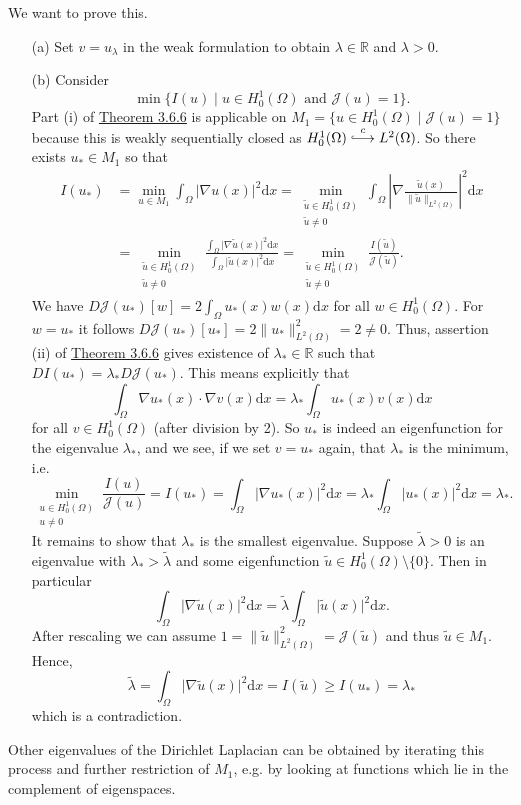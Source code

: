 \begin{example}
We want to prove this.
\begin{itemize}
	\item[(a)] Set $v=u_\lambda$ in the weak formulation to obtain $\lambda\in\mathbb{R}$ and $\lambda>0$.
	\item[(b)] Consider
	\[\min\{I(u)\mid u\in H_0^1(\Omega)\text{ and }\mathcal{J}(u)=1\}.\]
	Part (i) of \hyperlink{theorem_3_6_6}{Theorem 3.6.6} is applicable on $M_1=\{u\in H_0^1(\Omega)\mid\mathcal{J}(u)=1\}$ because this is weakly sequentially closed as $H_0^1(\Omega)\clonghookrightarrow L^2(\Omega)$. So there exists $u_*\in M_1$ so that
	\begin{align*}
		I(u_*)&=\min_{u\in M_1}{\int_\Omega{\lvert\nabla u(x)\rvert^2\mathrm{d}x}}=\min_{\substack{\tilde{u}\in H_0^1(\Omega)\\\tilde{u}\ne0}}{\int_\Omega{\left\lvert\nabla\frac{\tilde{u}(x)}{\lVert\tilde{u}\rVert_{L^2(\Omega)}}\right\rvert^2\mathrm{d}x}}\\
		&=\min_{\substack{\tilde{u}\in H_0^1(\Omega)\\\tilde{u}\ne0}}{\frac{\int_\Omega{\lvert\nabla\tilde{u}(x)\rvert^2\mathrm{d}x}}{\int_\Omega{\lvert\tilde{u}(x)\rvert^2\mathrm{d}x}}}=\min_{\substack{\tilde{u}\in H_0^1(\Omega)\\\tilde{u}\ne0}}{\frac{I(\tilde{u})}{\mathcal{J}(\tilde{u})}}.
	\end{align*}
	We have $D\mathcal{J}(u_*)[w]=2\int_\Omega{u_*(x)w(x)\mathrm{d}x}$ for all $w\in H_0^1(\Omega)$. For $w=u_*$ it follows $D\mathcal{J}(u_*)[u_*]=2\lVert u_*\rVert_{L^2(\Omega)}^2=2\ne0$. Thus, assertion (ii) of \hyperlink{theorem_3_6_6}{Theorem 3.6.6} gives existence of $\lambda_*\in\mathbb{R}$ such that $DI(u_*)=\lambda_*D\mathcal{J}(u_*)$. This means explicitly that
	\[\int_\Omega{\nabla u_*(x)\cdot\nabla v(x)\mathrm{d}x}=\lambda_*\int_\Omega{u_*(x)v(x)\mathrm{d}x}\]
	for all $v\in H_0^1(\Omega)$ (after division by 2). So $u_*$ is indeed an eigenfunction for the eigenvalue $\lambda_*$, and we see, if we set $v=u_*$ again, that $\lambda_*$ is the minimum, i.e.
	\[\min_{\substack{u\in H_0^1(\Omega)\\u\ne0}}{\frac{I(u)}{\mathcal{J}(u)}}=I(u_*)=\int_\Omega{\lvert\nabla u_*(x)\rvert^2\mathrm{d}x}=\lambda_*\int_\Omega{\lvert u_*(x)\rvert^2\mathrm{d}x}=\lambda_*.\]
	It remains to show that $\lambda_*$ is the smallest eigenvalue. Suppose $\tilde{\lambda}>0$ is an eigenvalue with $\lambda_*>\tilde{\lambda}$ and some eigenfunction $\tilde{u}\in H_0^1(\Omega)\setminus\{0\}$. Then in particular
	\[\int_\Omega{\lvert\nabla\tilde{u}(x)\rvert^2\mathrm{d}x}=\tilde{\lambda}\int_\Omega{\lvert\tilde{u}(x)\rvert^2\mathrm{d}x}.\]
	After rescaling we can assume $1=\lVert\tilde{u}\rVert_{L^2(\Omega)}^2=\mathcal{J}(\tilde{u})$ and thus $\tilde{u}\in M_1$. Hence,
	\[\tilde{\lambda}=\int_\Omega{\lvert\nabla\tilde{u}(x)\rvert^2\mathrm{d}x}=I(\tilde{u})\geq I(u_*)=\lambda_*\]
	which is a contradiction.\\
\end{itemize}

Other eigenvalues of the Dirichlet Laplacian can be obtained by iterating this process and further restriction of $M_1$, e.g. by looking at functions which lie in the complement of eigenspaces.
\end{example}